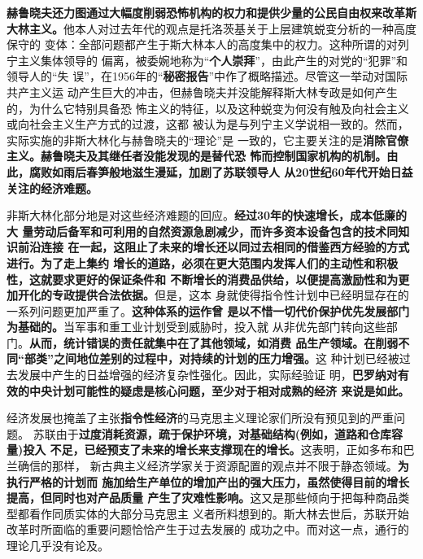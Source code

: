 \textbf{赫鲁晓夫还力图通过大幅度削弱恐怖机构的权力和提供少量的公民自由权来改革斯
  大林主义。}他本人对过去年代的观点是托洛茨基关于上层建筑蜕变分析的一种高度保守的
变体：全部问题都产生于斯大林本人的高度集中的权力。这种所谓的对列宁主义集体领导的
偏离，被委婉地称为“\textbf{个人崇拜}”，由此产生的对党的“犯罪”和领导人的“失
误”，在1956年的“\textbf{秘密报告}”中作了概略描述。尽管这一举动对国际共产主义运
动产生巨大的冲击，但赫鲁晓夫并没能解释斯大林专政是如何产生的，为什么它特别具备恐
怖主义的特征，以及这种蜕变为何没有触及向社会主义或向社会主义生产方式的过渡，这都
被认为是与列宁主义学说相一致的。然而，实际实施的非斯大林化与赫鲁晓夫的“理论”是
一致的，它主要关注的是\textbf{消除官僚主义。赫鲁晓夫及其继任者没能发现的是替代恐
  怖而控制国家机构的机制。由此，腐败如雨后春笋般地滋生漫延，加剧了苏联领导人
  从20世纪60年代开始日益关注的经济难题。}

非斯大林化部分地是对这些经济难题的回应。\textbf{经过30年的快速增长，成本低廉的大
  量劳动后备军和可利用的自然资源急剧减少，而许多资本设备包含的技术同知识前沿连接
  在一起，这阻止了未来的增长还以同过去相同的借鉴西方经验的方式进行。为了走上集约
  增长的道路，必须在更大范围内发挥人们的主动性和积极性，这就要求更好的保证条件和
  不断增长的消费品供给，以便提高激励性和为更加开化的专政提供合法依据。}但是，这本
身就使得指令性计划中已经明显存在的一系列问题更加严重了。\textbf{这种体系的运作曾
  是以不惜一切代价保护优先发展部门为基础的。}当军事和重工业计划受到威胁时，投入就
从非优先部门转向这些部门。\textbf{从而，统计错误的责任就集中在了其他领域，如消费
  品生产领域。在削弱不同“部类”之间地位差别的过程中，对持续的计划的压力增强。}这
种计划已经被过去发展中产生的日益增强的经济复杂性强化。因此，实际经验证
明，\textbf{巴罗纳对有效的中央计划可能性的疑虑是核心问题，至少对于相对成熟的经济
  来说是如此。}

经济发展也掩盖了主张\textbf{指令性经济}的马克思主义理论家们所没有预见到的严重问题。
苏联由于\textbf{过度消耗资源，疏于保护环境，对基础结构(例如，道路和仓库容量)投入
  不足，已经预支了未来的增长来支撑现在的增长。}这表明，正如多布和巴兰确信的那样，
新古典主义经济学家关于资源配置的观点并不限于静态领域。\textbf{为执行严格的计划而
  施加给生产单位的增加产出的强大压力，虽然使得目前的增长提高，但同时也对产品质量
  产生了灾难性影响。}这又是那些倾向于把每种商品类型都看作同质实体的大部分马克思主
义者所料想到的。斯大林去世后，苏联开始改革时所面临的重要问题恰恰产生于过去发展的
成功之中。而对这一点，通行的理论几乎没有论及。

